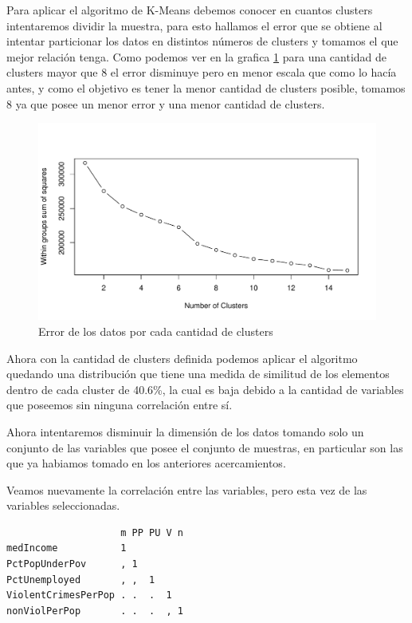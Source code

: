 \documentclass[a4paper,10pt,twocolumn]{article}
\begin{document}
	Para aplicar el algoritmo de K-Means debemos conocer en cuantos clusters intentaremos dividir la muestra, para esto hallamos el error que se obtiene al intentar particionar los datos en distintos números de clusters y tomamos el que mejor relación tenga. Como podemos ver en la grafica \ref{fig:cluster_n_1} para una cantidad de clusters mayor que 8 el error disminuye pero en menor escala que como lo hacía antes, y como el objetivo es tener la menor cantidad de clusters posible, tomamos 8 ya que posee un menor error y una menor cantidad de clusters.

	\begin{figure}[htb]
		\begin{center}
			\includegraphics[width=\columnwidth]{figures/cluster_n_1.pdf}
		\end{center}
		\caption{Error de los datos por cada cantidad de clusters \label{fig:cluster_n_1}}%
	\end{figure}

	Ahora con la cantidad de clusters definida podemos aplicar el algoritmo quedando una distribución que tiene una medida de similitud de los elementos dentro de cada cluster de 40.6\%, la cual es baja debido a la cantidad de variables que poseemos sin ninguna correlación entre sí.

	Ahora intentaremos disminuir la dimensión de los datos tomando solo un conjunto de las variables que posee el conjunto de muestras, en particular son las que ya habiamos tomado en los anteriores acercamientos.

	Veamos nuevamente la correlación entre las variables, pero esta vez de las variables seleccionadas.

	\begin{verbatim}
                    m PP PU V n
medIncome           1          
PctPopUnderPov      , 1        
PctUnemployed       , ,  1     
ViolentCrimesPerPop . .  .  1  
nonViolPerPop       . .  .  , 1
	\end{verbatim}
\end{document}
